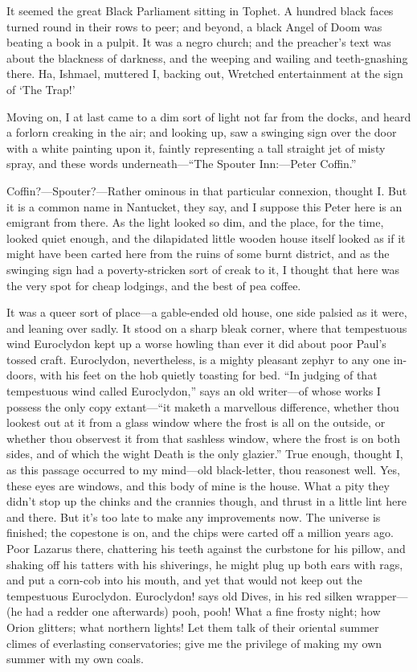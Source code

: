 \documentclass[12pt,ebook,oneside,openany]{memoir} %
\begin{document}
It seemed the great Black Parliament sitting in Tophet. A hundred black faces turned round in their rows to peer; and beyond, a black Angel of Doom was beating a book in a pulpit. It was a negro church; and the preacher’s text was about the blackness of darkness, and the weeping and wailing and teeth-gnashing there. Ha, Ishmael, muttered I, backing out, Wretched entertainment at the sign of ‘The Trap!’

Moving on, I at last came to a dim sort of light not far from the docks, and heard a forlorn creaking in the air; and looking up, saw a swinging sign over the door with a white painting upon it, faintly representing a tall straight jet of misty spray, and these words underneath—“The Spouter Inn:—Peter Coffin.”

Coffin?—Spouter?—Rather ominous in that particular connexion, thought I. But it is a common name in Nantucket, they say, and I suppose this Peter here is an emigrant from there. As the light looked so dim, and the place, for the time, looked quiet enough, and the dilapidated little wooden house itself looked as if it might have been carted here from the ruins of some burnt district, and as the swinging sign had a poverty-stricken sort of creak to it, I thought that here was the very spot for cheap lodgings, and the best of pea coffee.

It was a queer sort of place—a gable-ended old house, one side palsied as it were, and leaning over sadly. It stood on a sharp bleak corner, where that tempestuous wind Euroclydon kept up a worse howling than ever it did about poor Paul’s tossed craft. Euroclydon, nevertheless, is a mighty pleasant zephyr to any one in-doors, with his feet on the hob quietly toasting for bed. “In judging of that tempestuous wind called Euroclydon,” says an old writer—of whose works I possess the only copy extant—“it maketh a marvellous difference, whether thou lookest out at it from a glass window where the frost is all on the outside, or whether thou observest it from that sashless window, where the frost is on both sides, and of which the wight Death is the only glazier.” True enough, thought I, as this passage occurred to my mind—old black-letter, thou reasonest well. Yes, these eyes are windows, and this body of mine is the house. What a pity they didn’t stop up the chinks and the crannies though, and thrust in a little lint here and there. But it’s too late to make any improvements now. The universe is finished; the copestone is on, and the chips were carted off a million years ago. Poor Lazarus there, chattering his teeth against the curbstone for his pillow, and shaking off his tatters with his shiverings, he might plug up both ears with rags, and put a corn-cob into his mouth, and yet that would not keep out the tempestuous Euroclydon. Euroclydon! says old Dives, in his red silken wrapper—(he had a redder one afterwards) pooh, pooh! What a fine frosty night; how Orion glitters; what northern lights! Let them talk of their oriental summer climes of everlasting conservatories; give me the privilege of making my own summer with my own coals.
\end{document}
